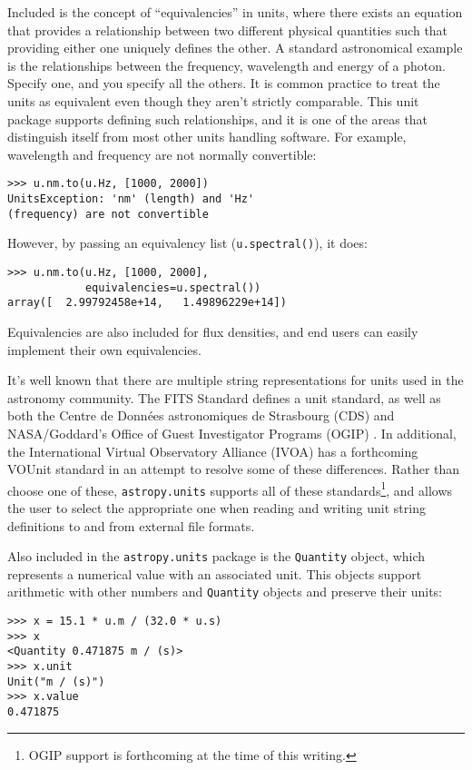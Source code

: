 \documentclass[traditabstract]{aa}
\begin{document}
Included is the concept of ``equivalencies'' in units, where there
exists an equation that provides a relationship between two different
physical quantities such that providing either one uniquely defines
the other.  A standard astronomical example is the relationships
between the frequency, wavelength and energy of a photon.  Specify
one, and you specify all the others. It is common practice to treat
the units as equivalent even though they aren't strictly comparable.
This unit package supports defining such relationships, and it is one
of the areas that distinguish itself from most other units handling
software.  For example, wavelength and frequency are not normally
convertible:
\begin{verbatim}
>>> u.nm.to(u.Hz, [1000, 2000])
UnitsException: 'nm' (length) and 'Hz'
(frequency) are not convertible
\end{verbatim}
However, by passing an equivalency list (\texttt{u.spectral()}), it
does:
\begin{verbatim}
>>> u.nm.to(u.Hz, [1000, 2000],
            equivalencies=u.spectral())
array([  2.99792458e+14,   1.49896229e+14])
\end{verbatim}
Equivalencies are also included for flux densities, and end users can
easily implement their own equivalencies.

It's well known that there are multiple string representations for
units used in the astronomy community.  The FITS Standard
\cite{fits2008} defines a unit standard, as well as both the Centre de
Donn\'ees astronomiques de Strasbourg (CDS) \citep{ochsenbein2000cds}
and NASA/Goddard's Office of Guest Investigator Programs (OGIP)
\citep{george1995ogip}.  In additional, the International Virtual
Observatory Alliance (IVOA) has a forthcoming VOUnit standard
\citep{derriere2012vounit} in an attempt to resolve some of these
differences.  Rather than choose one of these, \texttt{astropy.units}
supports all of these standards\footnote{OGIP support is forthcoming
  at the time of this writing.}, and allows the user to select the
appropriate one when reading and writing unit string definitions to
and from external file formats.

Also included in the \texttt{astropy.units} package is the
\texttt{Quantity} object, which represents a numerical value with an
associated unit.  This objects support arithmetic with other numbers
and \texttt{Quantity} objects and preserve their units:
\begin{verbatim}
>>> x = 15.1 * u.m / (32.0 * u.s)
>>> x
<Quantity 0.471875 m / (s)>
>>> x.unit
Unit("m / (s)")
>>> x.value
0.471875
\end{verbatim}
\end{document}
